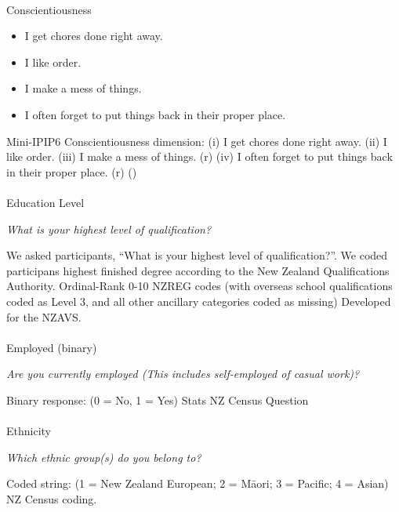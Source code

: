 \documentclass[
  single column]{article}
\makeatletter
\let\oldparagraph\paragraph
\renewcommand{\paragraph}{
    \@ifstar
      \xxxParagraphStar
      \xxxParagraphNoStar
  }
\newcommand{\xxxParagraphStar}[1]{\oldparagraph*{#1}\mbox{}}
\newcommand{\xxxParagraphNoStar}[1]{\oldparagraph{#1}\mbox{}}
\providecommand{\tightlist}{%
  \setlength{\itemsep}{0pt}\setlength{\parskip}{0pt}}\usepackage{longtable,booktabs,array}
\makeatother
\begin{document}
\paragraph{Conscientiousness}\label{conscientiousness}

\begin{itemize}
\tightlist
\item
  I get chores done right away.
\item
  I like order.
\item
  I make a mess of things.
\item
  I often forget to put things back in their proper place.
\end{itemize}

Mini-IPIP6 Conscientiousness dimension: (i) I get chores done right
away. (ii) I like order. (iii) I make a mess of things. (r) (iv) I often
forget to put things back in their proper place. (r)
()

\paragraph{Education Level}\label{education-level}

\emph{What is your highest level of qualification?}

We asked participants, ``What is your highest level of qualification?''.
We coded participans highest finished degree according to the New
Zealand Qualifications Authority. Ordinal-Rank 0-10 NZREG codes (with
overseas school qualifications coded as Level 3, and all other ancillary
categories coded as missing) Developed for the NZAVS.

\paragraph{Employed (binary)}\label{employed-binary}

\emph{Are you currently employed (This includes self-employed of casual
work)?}

Binary response: (0 = No, 1 = Yes) Stats NZ Census Question

\paragraph{Ethnicity}\label{ethnicity}

\emph{Which ethnic group(s) do you belong to?}

Coded string: (1 = New Zealand European; 2 = Māori; 3 = Pacific; 4 =
Asian) NZ Census coding.
\end{document}
